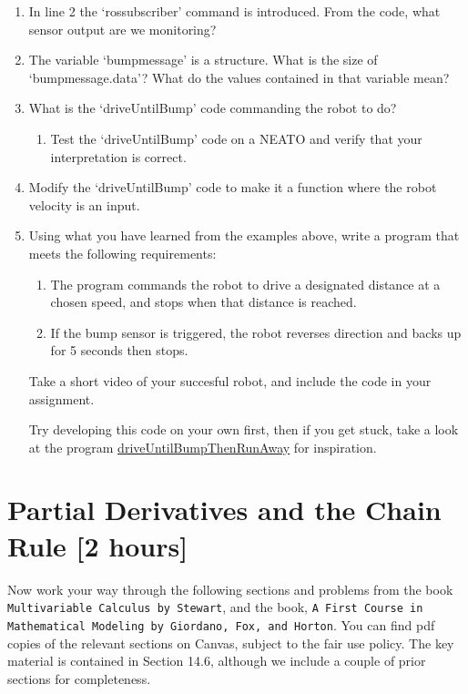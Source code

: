 \documentclass[M3_Night2_Solutions]{subfiles}
\begin{document}
\begin{enumerate}[resume=exercises, label=\textbf{Exercise} (\arabic*)]

\item In line 2 the `rossubscriber' command is introduced. From the code, what sensor output are we monitoring? 

\item The variable `bumpmessage' is a structure. What is the size of `bumpmessage.data'? What do the values contained in that variable mean?

\item What is the `driveUntilBump' code commanding the robot to do? 
\begin{enumerate}
\item Test the `driveUntilBump' code on a NEATO and verify that your interpretation is correct.
\end {enumerate}

\item Modify the `driveUntilBump' code to make it a function where the robot velocity is an input.

\item Using what you have learned from the examples above, write a program that meets the following requirements:
\begin{enumerate}
\item The program commands the robot to drive a designated distance at a chosen speed, and stops when that distance is reached.
\item If the bump sensor is triggered, the robot reverses direction and backs up for 5 seconds then stops.
\end{enumerate}

Take a short video of your succesful robot, and include the code in your assignment.

Try developing this code on your own first, then if you get stuck, take a look at the program \href{https://drive.google.com/file/d/1whHgaPFppUErc7qB__v0tZ_5z99tzGOz/view?usp=sharing}{driveUntilBumpThenRunAway} for inspiration.

\end{enumerate}


\section{Partial Derivatives and the Chain Rule [2 hours]}

Now work your way through the following sections and problems from the book {\tt Multivariable Calculus by Stewart}, and the book, {\tt A First Course in Mathematical Modeling by Giordano, Fox, and Horton}. You can find pdf copies of the relevant sections on Canvas, subject to the fair use policy. The key material is contained in Section 14.6, although we include a couple of prior sections for completeness.
\end{document}
